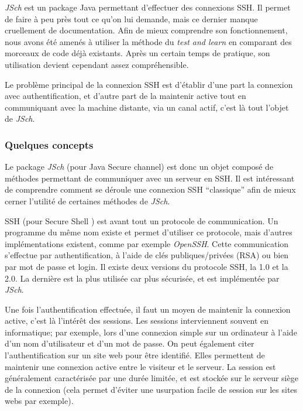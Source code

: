 \par \emph{JSch} est un package Java permettant d'effectuer des connexions SSH. Il permet de faire à peu près tout ce qu'on lui demande, mais ce dernier manque cruellement de documentation. Afin de mieux comprendre son fonctionnement, nous avons été amenés à utiliser la méthode du \emph{test and learn} en comparant des morceaux de code déjà existants. Après un certain temps de pratique, son utilisation devient cependant assez compréhensible.

\par Le problème principal de la connexion SSH est d'établir d'une part la connexion avec authentification, et d'autre part de la maintenir active tout en communiquant avec la machine distante, via un canal actif, c'est là tout l'objet de \emph{JSch}.

\subsubsection{Quelques concepts}
\label{sec:quelques-concepts}

\par Le package \emph{JSch} (pour Java Secure channel) est donc un objet composé de méthodes permettant de communiquer avec un serveur en SSH. Il est intéressant de comprendre comment se déroule une connexion SSH ``classique'' afin de mieux cerner l'utilité de certaines méthodes de \emph{JSch}.
\par SSH (pour Secure Shell ) est avant tout un protocole de communication. Un programme du même nom existe et permet d'utiliser ce protocole, mais d'autres implémentations existent, comme par exemple \emph{OpenSSH}. Cette communication s'effectue par authentification, à l'aide de clés publiques/privées (RSA) ou bien par mot de passe et login. Il existe deux versions du protocole SSH, la 1.0 et la 2.0. La dernière est la plus utilisée car plus sécurisée, et est implémentée par \emph{JSch}.
\par Une fois l'authentification effectuée, il faut un moyen de maintenir la connexion active, c'est là l'intérêt des sessions. Les sessions interviennent souvent en informatique; par exemple, lors d'une connexion simple sur un ordinateur à l'aide d'un nom d'utilisateur et d'un mot de passe. On peut également citer l'authentification sur un site web pour être identifié. Elles permettent de maintenir une connexion active entre le visiteur et le serveur. La session est généralement caractérisée par une durée limitée, et est stockée sur le serveur siège de la connexion (cela permet d'éviter une usurpation facile de session sur les sites webs par exemple). 

